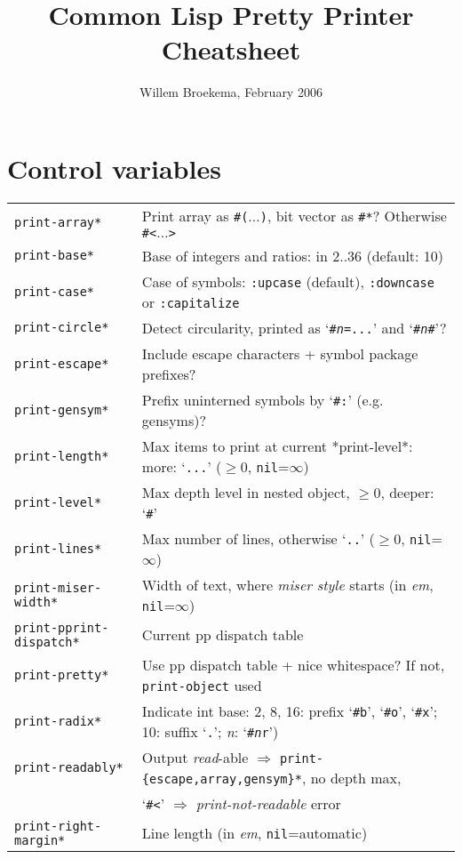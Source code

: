 \documentclass{article}
\begin{document}
\title{Common Lisp Pretty Printer Cheatsheet}
\author{Willem Broekema, February 2006}
\date{}
\maketitle

\section{Control variables}
\begin{tabular}{ll}
 {\tt *print-array*}  & Print array as {\tt \#(}$\ldots${\tt )}, bit vector as {\tt \#*}? Otherwise {\tt \#<}$\ldots${\tt >} \\
 {\tt *print-base*}   & Base of integers and ratios: in 2..36 (default: 10) \\
 {\tt *print-case*}   & Case of symbols: {\tt :upcase} (default), {\tt :downcase} or {\tt :capitalize} \\
 {\tt *print-circle*} & Detect circularity, printed as `{\tt \#{\em n}=...}' and `{\tt \#{\em n}\#}'? \\
 {\tt *print-escape*} & Include escape characters + symbol package prefixes? \\
 {\tt *print-gensym*} & Prefix uninterned symbols by `{\tt \#:}' (e.g. gensyms)? \\
 {\tt *print-length*} & Max items to print at current *print-level*: more: `{\tt ...}'
                        ($\ge 0$, {\tt nil}=$\infty$) \\
 {\tt *print-level*}  & Max depth level in nested object, $\ge 0$, deeper: `{\tt \#}' \\
 {\tt *print-lines*}  & Max number of lines, otherwise `{\tt ..}' ($\ge 0$, {\tt nil}=$\infty$) \\
 {\tt *print-miser-width*} & Width of text, where {\em miser style} starts (in {\em em}, {\tt nil}=$\infty$) \\
 {\tt *print-pprint-dispatch*} & Current pp dispatch table \\
 {\tt *print-pretty*}     & Use pp dispatch table + nice whitespace? If not, {\tt print-object} used \\
 {\tt *print-radix*}      & Indicate int base: 2, 8, 16: prefix `{\tt \#b}', `{\tt \#o}',
                            `{\tt \#x}'; 10: suffix `{\tt .}'; {\em n}: `{\tt \#{\em n}r}') \\
 {\tt *print-readably*}   & Output {\em read}-able $\Rightarrow$ {\tt *print-\{escape,array,gensym\}*},
                          no depth max, \\ & `{\tt \#<}' $\Rightarrow$ {\em print-not-readable} error \\
 {\tt *print-right-margin*} & Line length (in {\em em}, {\tt nil}=automatic) \\
\end{tabular}
\end{document}
